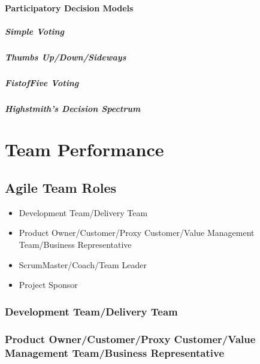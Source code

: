 \documentclass[letterpaper,10pt,english]{jupyterBook}
\begin{document}
\paragraph{Participatory Decision Models}
\label{\detokenize{APM/agile:participatory-decision-models}}

\subparagraph{Simple Voting}
\label{\detokenize{APM/agile:simple-voting}}

\subparagraph{Thumbs Up/Down/Sideways}
\label{\detokenize{APM/agile:thumbs-up-down-sideways}}

\subparagraph{Fist\sphinxhyphen{}of\sphinxhyphen{}Five Voting}
\label{\detokenize{APM/agile:fist-of-five-voting}}

\subparagraph{Highstmith’s Decision Spectrum}
\label{\detokenize{APM/agile:highstmith-s-decision-spectrum}}

\section{Team Performance}
\label{\detokenize{APM/agile:team-performance}}

\subsection{Agile Team Roles}
\label{\detokenize{APM/agile:agile-team-roles}}\begin{itemize}
\item {} 
\sphinxAtStartPar
Development Team/Delivery Team

\item {} 
\sphinxAtStartPar
Product Owner/Customer/Proxy Customer/Value Management Team/Business Representative

\item {} 
\sphinxAtStartPar
ScrumMaster/Coach/Team Leader

\item {} 
\sphinxAtStartPar
Project Sponsor

\end{itemize}


\subsubsection{Development Team/Delivery Team}
\label{\detokenize{APM/agile:development-team-delivery-team}}

\subsubsection{Product Owner/Customer/Proxy Customer/Value Management Team/Business Representative}
\label{\detokenize{APM/agile:product-owner-customer-proxy-customer-value-management-team-business-representative}}
\end{document}
